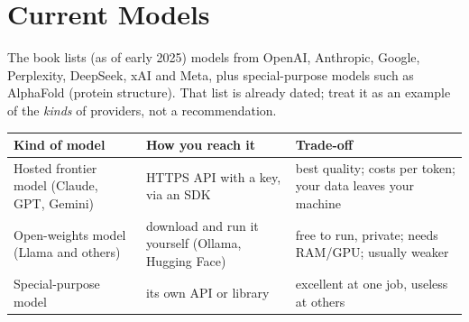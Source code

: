 \begin{center}
\end{center}

\section{Current Models}

The book lists (as of early 2025) models from OpenAI, Anthropic, Google, Perplexity, DeepSeek,
xAI and Meta, plus special-purpose models such as AlphaFold (protein structure). That list is
already dated; treat it as an example of the \emph{kinds} of providers, not a recommendation.

\begin{center}
\begin{tabularx}{\linewidth}{@{}l X X@{}}
\toprule
\textbf{Kind of model} & \textbf{How you reach it} & \textbf{Trade-off} \\
\midrule
Hosted frontier model (Claude, GPT, Gemini) & HTTPS API with a key, via an SDK & best quality; costs per token; your data leaves your machine \\
Open-weights model (Llama and others) & download and run it yourself (Ollama, Hugging Face) & free to run, private; needs RAM/GPU; usually weaker \\
Special-purpose model & its own API or library & excellent at one job, useless at others \\
\bottomrule
\end{tabularx}
\end{center}

